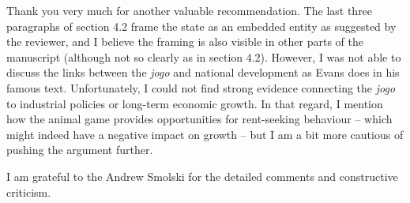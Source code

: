 \documentclass[a4paper,12pt]{article}
\begin{document}
\vspace{.25cm}

Thank you very much for another valuable recommendation. The last three paragraphs of section 4.2 frame the state as an embedded entity as suggested by the reviewer, and I believe the framing is also visible in other parts of the manuscript (although not so clearly as in section 4.2). However, I was not able to discuss the links between the \textit{jogo} and national development as Evans does in his famous text. Unfortunately, I could not find strong evidence connecting the \textit{jogo} to industrial policies or long-term economic growth. In that regard, I mention how the animal game provides opportunities for rent-seeking behaviour -- which might indeed have a negative impact on growth -- but I am a bit more cautious of pushing the argument further. 

\vspace{.5cm}

I am grateful to the Andrew Smolski for the detailed comments and constructive criticism.  


\newpage


\end{document}
